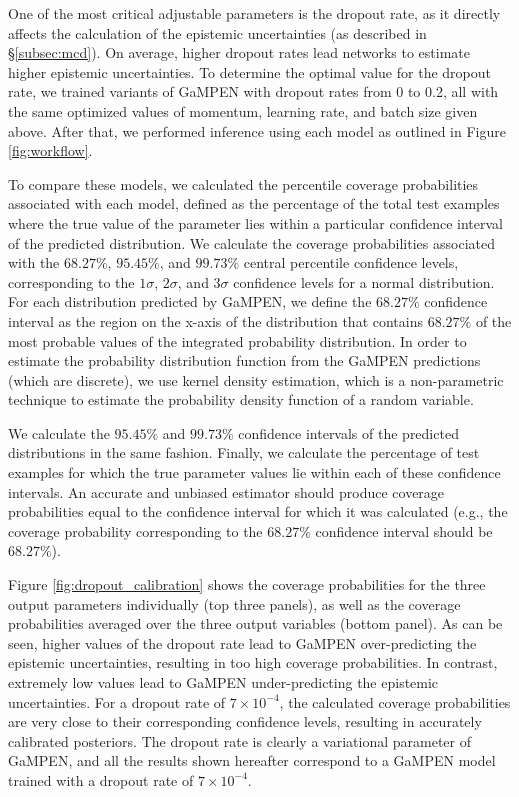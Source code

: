 \documentclass[twocolumn]{aastex63}
\newcommand\gampen{GaMPEN}
\begin{document}
\begin{CJK*}{UTF8}{gbsn}
One of the most critical adjustable parameters is the dropout rate, as it directly affects the calculation of the epistemic uncertainties (as described in \S \ref{subsec:mcd}). On average, higher dropout rates lead networks to estimate higher epistemic uncertainties. To determine the optimal value for the dropout rate, we trained variants of \gampen{} with dropout rates from 0 to 0.2, all with the same optimized values of momentum, learning rate, and batch size given above. After that, we performed inference using each model as outlined in Figure \ref{fig:workflow}. 

To compare these models, we calculated the percentile coverage probabilities associated with each model, defined as the percentage of the total test examples where the true value of the parameter lies within a particular confidence interval of the predicted distribution. We calculate the coverage probabilities associated with the $68.27\%$, $95.45\%$, and $99.73\%$ central percentile confidence levels, corresponding to the $1\sigma$, $2\sigma$, and $3\sigma$ confidence levels for a normal distribution. For each distribution predicted by \gampen{}, we define the $68.27\%$ confidence interval as the region on the x-axis of the distribution that contains $68.27\%$ of the most probable values of the integrated probability distribution. In order to estimate the probability distribution function from the \gampen{} predictions (which are discrete), we use kernel density estimation, which is a non-parametric technique to estimate the probability density function of a random variable. 

We calculate the $95.45\%$ and $99.73\%$ confidence intervals of the predicted distributions in the same fashion. Finally, we calculate the percentage of test examples for which the true parameter values lie within each of these confidence intervals. An accurate and unbiased estimator should produce coverage probabilities equal to the confidence interval for which it was calculated (e.g., the coverage probability corresponding to the $68.27\%$ confidence interval should be $68.27\%$).

Figure \ref{fig:dropout_calibration} shows the coverage probabilities for the three output parameters individually (top three panels), as well as the coverage probabilities averaged over the three output variables (bottom panel). As can be seen, higher values of the dropout rate lead to \gampen{} over-predicting the epistemic uncertainties, resulting in too high coverage probabilities. In contrast, extremely low values lead to \gampen{} under-predicting the epistemic uncertainties. For a dropout rate of $7\times10^{-4}$, the calculated coverage probabilities are very close to their corresponding confidence levels, resulting in accurately calibrated posteriors. The dropout rate is clearly a variational parameter of \gampen{}, and all the results shown hereafter correspond to a \gampen{} model trained with a dropout rate of $7\times10^{-4}$.


\end{CJK*}
\end{document}

